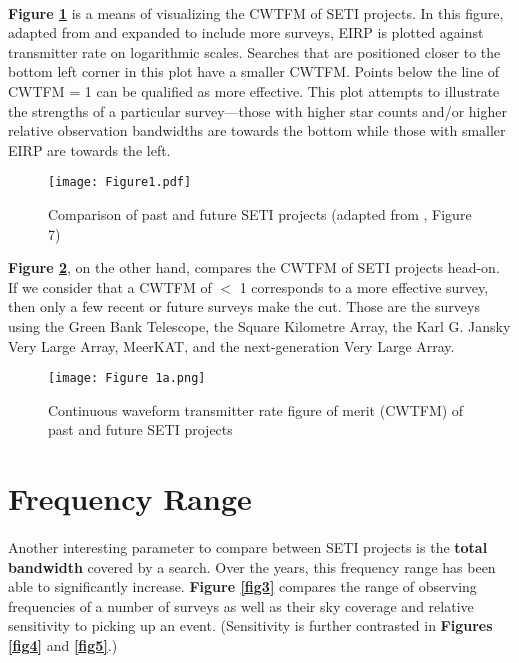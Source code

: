\documentclass{article}
\begin{document}
\paragraph{}
\textbf{Figure \ref{fig1}} is a means of visualizing the CWTFM of SETI projects. In this figure, adapted from \citet{Enriquez_2017} and expanded to include more surveys, EIRP is plotted against transmitter rate on logarithmic scales. Searches that are positioned closer to the bottom left corner in this plot have a smaller CWTFM. Points below the line of CWTFM = 1 can be qualified as more effective. This plot attempts to illustrate the strengths of a particular survey---those with higher star counts and/or higher relative observation bandwidths are towards the bottom while those with smaller EIRP are towards the left.

\begin{figure}[H]
\begin{center}
\texttt{[image: Figure1.pdf]}
\caption{Comparison of past and future SETI projects (adapted from \citet{Enriquez_2017}, Figure 7) \textbf{\label{fig1}}}
\end{center}
\end{figure}

\textbf{Figure \ref{fig2}}, on the other hand, compares the CWTFM of SETI projects head-on. If we consider that a CWTFM of $<$ 1 corresponds to a more effective survey, then only a few recent or future surveys make the cut. Those are the surveys using the Green Bank Telescope, the Square Kilometre Array, the Karl G. Jansky Very Large Array, MeerKAT, and the next-generation Very Large Array.

\begin{figure}[H]
\begin{center}
\texttt{[image: Figure 1a.png]}
\caption{Continuous waveform transmitter rate figure of merit (CWTFM) of past and future SETI projects \textbf{\label{fig2}}}
\end{center}
\end{figure}


\section{Frequency Range}

\paragraph{}
Another interesting parameter to compare between SETI projects is the \textbf{total bandwidth} covered by a search. Over the years, this frequency range has been able to significantly increase. \textbf{Figure \ref{fig3}} compares the range of observing frequencies of a number of surveys as well as their sky coverage and relative sensitivity to picking up an event. (Sensitivity is further contrasted in \textbf{Figures \ref{fig4}} and \textbf{\ref{fig5}}.)
\end{document}
